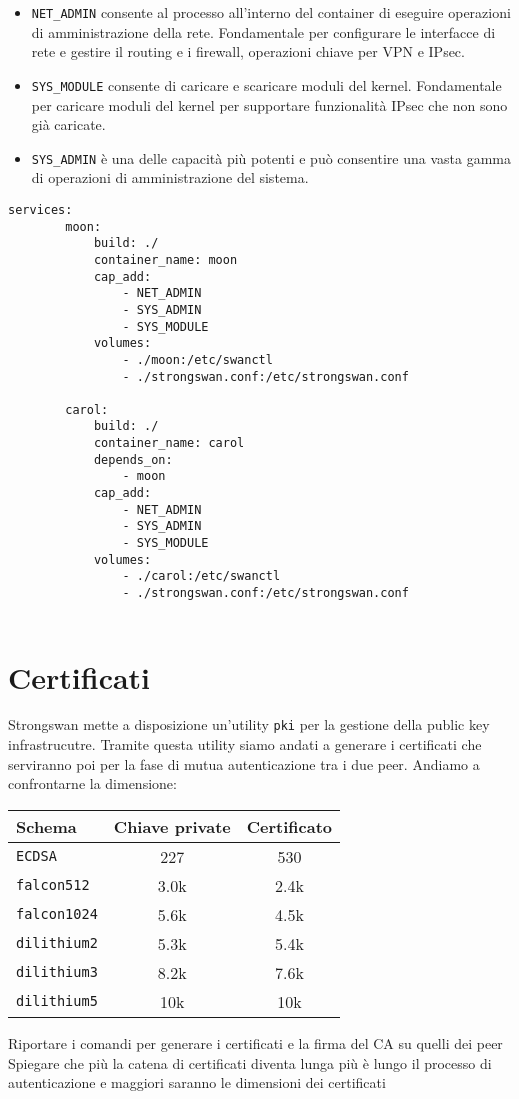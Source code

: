 \begin{itemize}
    \item \texttt{NET\_ADMIN} consente al processo all'interno del
    container di eseguire operazioni di amministrazione della rete. 
    Fondamentale per configurare le interfacce di rete e gestire il routing e i
    firewall, operazioni chiave per VPN e IPsec.
    \item \texttt{SYS\_MODULE} consente di caricare e scaricare moduli
    del kernel. Fonda\-mentale per caricare moduli del kernel per supportare 
    funzionalità IPsec che non sono già caricate.
    \item \texttt{SYS\_ADMIN} è una delle capacità più potenti e può
    consentire una vasta gamma di operazioni di amministrazione del sistema.

\end{itemize}

\begin{lstlisting}[style=yaml]
    services: 
        moon: 
            build: ./ 
            container_name: moon 
            cap_add: 
                - NET_ADMIN 
                - SYS_ADMIN 
                - SYS_MODULE 
            volumes: 
                - ./moon:/etc/swanctl 
                - ./strongswan.conf:/etc/strongswan.conf 
        
        carol: 
            build: ./ 
            container_name: carol 
            depends_on: 
                - moon 
            cap_add: 
                - NET_ADMIN 
                - SYS_ADMIN 
                - SYS_MODULE 
            volumes: 
                - ./carol:/etc/swanctl 
                - ./strongswan.conf:/etc/strongswan.conf 
    
\end{lstlisting}

\section{Certificati}

Strongswan mette a disposizione un'utility \texttt{pki} per la gestione della public key infrastrucutre.
Tramite questa utility siamo andati a generare i certificati che serviranno poi per la fase di
mutua autenticazione tra i due peer.
Andiamo a confrontarne la dimensione:
\begin{table}[h]
    \centering
    \begin{tabular}{lcc}
        \toprule
        \textbf{Schema} & \textbf{Chiave private} & \textbf{Certificato} \\
        \midrule
        \texttt{ECDSA} & 227 & 530 \\
        \texttt{falcon512} & 3.0k & 2.4k\\
        \texttt{falcon1024} & 5.6k & 4.5k\\
        \texttt{dilithium2} & 5.3k & 5.4k\\
        \texttt{dilithium3} & 8.2k & 7.6k\\
        \texttt{dilithium5} & 10k & 10k\\
    \end{tabular}
\end{table}
    
Riportare i comandi per generare i certificati e la firma del CA su quelli dei peer
Spiegare che più la catena di certificati diventa lunga più è lungo il processo di autenticazione
e maggiori saranno le dimensioni dei certificati

